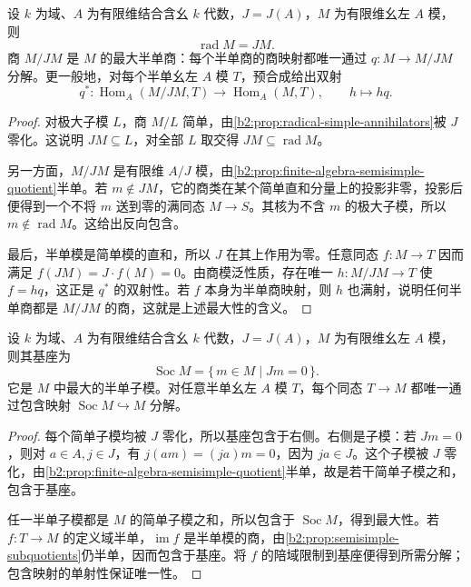 \begin{theorem}\label{b2:thm:module-radical-jm}
	设 \(k\) 为域、\(A\) 为有限维结合含幺 \(k\) 代数，\(J=J(A)\)，\(M\) 为有限维幺左 \(A\) 模，则
	\[
		\operatorname{rad}M=JM.
	\]
	商 \(M/JM\) 是 \(M\) 的最大半单商：每个半单商的商映射都唯一通过 \(q:M\to M/JM\) 分解。更一般地，对每个半单幺左 \(A\) 模 \(T\)，预合成给出双射
	\[
		q^*:\operatorname{Hom}_A(M/JM,T)\longrightarrow\operatorname{Hom}_A(M,T), \qquad h\longmapsto hq.
	\]
\end{theorem}
\begin{proof}
	对极大子模 \(L\)，商 \(M/L\) 简单，由\cref{b2:prop:radical-simple-annihilators}被 \(J\) 零化。这说明 \(JM\subseteq L\)，对全部 \(L\) 取交得 \(JM\subseteq\operatorname{rad}M\)。

	另一方面，\(M/JM\) 是有限维 \(A/J\) 模，由\cref{b2:prop:finite-algebra-semisimple-quotient}半单。若 \(m\notin JM\)，它的商类在某个简单直和分量上的投影非零，投影后便得到一个不将 \(m\) 送到零的满同态 \(M\to S\)。其核为不含 \(m\) 的极大子模，所以 \(m\notin\operatorname{rad}M\)。这给出反向包含。

	最后，半单模是简单模的直和，所以 \(J\) 在其上作用为零。任意同态 \(f:M\to T\) 因而满足 \(f(JM)=J\cdot f(M)=0\)。由商模泛性质，存在唯一 \(h:M/JM\to T\) 使 \(f=hq\)，这正是 \(q^*\) 的双射性。若 \(f\) 本身为半单商映射，则 \(h\) 也满射，说明任何半单商都是 \(M/JM\) 的商，这就是上述最大性的含义。
\end{proof}

\begin{proposition}\label{b2:prop:module-socle-annihilator}
	设 \(k\) 为域、\(A\) 为有限维结合含幺 \(k\) 代数，\(J=J(A)\)，\(M\) 为有限维幺左 \(A\) 模，则其基座为
	\[
		\operatorname{Soc}M=\{\,m\in M\mid Jm=0\,\}.
	\]
	它是 \(M\) 中最大的半单子模。对任意半单幺左 \(A\) 模 \(T\)，每个同态 \(T\to M\) 都唯一通过包含映射 \(\operatorname{Soc}M\hookrightarrow M\) 分解。
\end{proposition}
\begin{proof}
	每个简单子模均被 \(J\) 零化，所以基座包含于右侧。右侧是子模：若 \(Jm=0\)，则对 \(a\in A,j\in J\)，有 \(j(am)=(ja)m=0\)，因为 \(ja\in J\)。这个子模被 \(J\) 零化，由\cref{b2:prop:finite-algebra-semisimple-quotient}半单，故是若干简单子模之和，包含于基座。

	任一半单子模都是 \(M\) 的简单子模之和，所以包含于 \(\operatorname{Soc}M\)，得到最大性。若 \(f:T\to M\) 的定义域半单，\(\operatorname{im}f\) 是半单模的商，由\cref{b2:prop:semisimple-subquotients}仍半单，因而包含于基座。将 \(f\) 的陪域限制到基座便得到所需分解；包含映射的单射性保证唯一性。
\end{proof}


